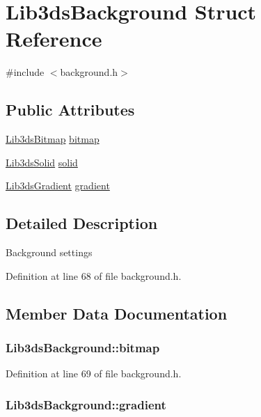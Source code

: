 \hypertarget{struct_lib3ds_background}{\section{Lib3ds\-Background Struct Reference}
\label{struct_lib3ds_background}
}


{\ttfamily \#include $<$background.\-h$>$}

\subsection*{Public Attributes}
\begin{DoxyCompactItemize}
\item 
\hyperlink{struct_lib3ds_bitmap}{Lib3ds\-Bitmap} \hyperlink{struct_lib3ds_background_a459fab954affa243731a946e37b3d080}{bitmap}
\item 
\hyperlink{struct_lib3ds_solid}{Lib3ds\-Solid} \hyperlink{struct_lib3ds_background_aa730e47345a354099d5f96914f3f0068}{solid}
\item 
\hyperlink{struct_lib3ds_gradient}{Lib3ds\-Gradient} \hyperlink{struct_lib3ds_background_ae3e57f31fc43d627905a05e4ab1e2384}{gradient}
\end{DoxyCompactItemize}


\subsection{Detailed Description}
Background settings 

Definition at line 68 of file background.\-h.



\subsection{Member Data Documentation}
\hypertarget{struct_lib3ds_background_a459fab954affa243731a946e37b3d080}{
\subsubsection[{bitmap}]{ Lib3ds\-Background\-::bitmap}}\label{struct_lib3ds_background_a459fab954affa243731a946e37b3d080}


Definition at line 69 of file background.\-h.

\hypertarget{struct_lib3ds_background_ae3e57f31fc43d627905a05e4ab1e2384}{
\subsubsection[{gradient}]{ Lib3ds\-Background\-::gradient}}\label{struct_lib3ds_background_ae3e57f31fc43d627905a05e4ab1e2384}


